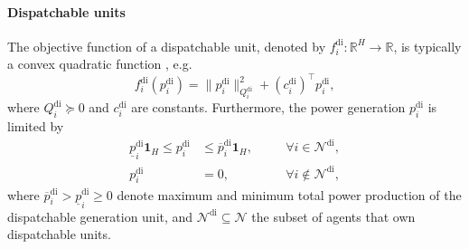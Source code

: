 \documentclass{IEEEtran}  %
\newcommand{\0}{\mathbf{0}}
\newcommand{\1}{\mathbf{1}}
\begin{document}
\paragraph*{Dispatchable units}
The objective function of a dispatchable unit, denoted by $f_{i}^{\mathrm{di}}: \mathbb{R}^{H} \to \mathbb{R}$, is typically a convex quadratic function   \cite{atzeni2013,hans2018,sorin2019}, e.g. 
\begin{equation}
f_{i}^{\mathrm{di}}(p_{i}^{\mathrm{di}}) = \|p_{i}^{\mathrm{di}}\|_{Q_i^{\mathrm{di}}}^2+ {(c_i^\mathrm{di})}^\top p_{i}^{\mathrm{di}}, \label{eq:f_dg}
\end{equation}
where $Q_i^{\mathrm{di}}\succcurlyeq0$ and $c_i^{\mathrm{di}}$ are constants.
Furthermore, the power generation $p_{i}^{\mathrm{di}}$ is limited by 
\begin{equation}
\begin{aligned}
\underline{p}_{i}^{\mathrm{di}}\1_{H} \leq p_{i}^{\mathrm{di}} &\leq \overline{p}_{i}^{\mathrm{di}}\1_{H}, \quad& &\forall i\in\mathcal{N}^{\mathrm{di}},\\
p_{i}^{\mathrm{di}} &= 0, \quad& &\forall i\notin\mathcal{N}^{\mathrm{di}},
\end{aligned}
\label{eq:p_dg_bound}	
\end{equation}
where $\overline{p}_{i}^{\mathrm{di}} > \underline{p}_{i}^{\mathrm{di}}\ge 0$ denote maximum and minimum total power production of the dispatchable generation unit, and $\mathcal{N}^{\mathrm{di}}\subseteq\mathcal{N}$ the subset of agents that own dispatchable units.

\end{document}
